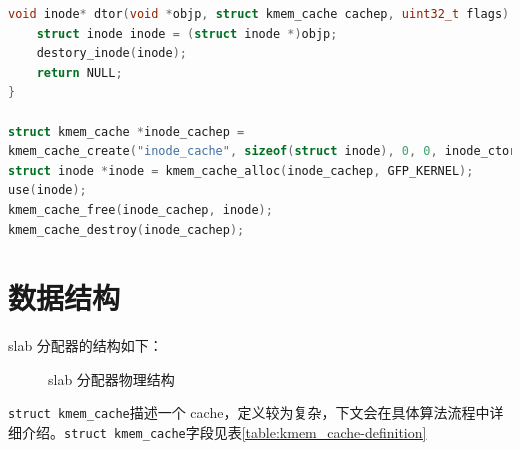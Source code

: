\documentclass[AutoFakeBold]{LZUThesis}
\begin{document}
\begin{sloppypar}
\begin{lstlisting}[language = c]
void inode* dtor(void *objp, struct kmem_cache cachep, uint32_t flags) {
    struct inode inode = (struct inode *)objp;
    destory_inode(inode);
    return NULL;
}

struct kmem_cache *inode_cachep =
kmem_cache_create("inode_cache", sizeof(struct inode), 0, 0, inode_ctor);
struct inode *inode = kmem_cache_alloc(inode_cachep, GFP_KERNEL);
use(inode);
kmem_cache_free(inode_cachep, inode);
kmem_cache_destroy(inode_cachep);
\end{lstlisting}


\section{数据结构}

slab 分配器的结构如下：

\begin{figure}
\centering

\caption{slab 分配器物理结构}
\end{figure}

\texttt{struct\ kmem\_cache}描述一个
cache，定义较为复杂，下文会在具体算法流程中详细介绍。\texttt{struct\ kmem\_cache}字段见表\ref{table:kmem_cache-definition}


\end{sloppypar}
\end{document}
